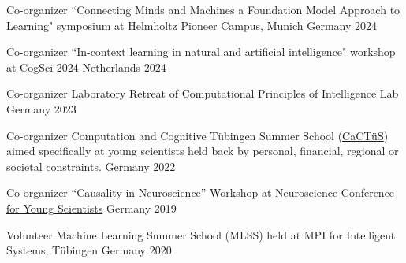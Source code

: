 
\begin{cvhonors}

  \cvhonor
    {Co-organizer} %
    {``Connecting Minds and Machines a Foundation Model Approach to Learning" symposium at Helmholtz Pioneer Campus, Munich} %
    {Germany} %
    {2024} %
    
  \cvhonor
    {Co-organizer} %
    {``In-context learning in natural and artificial intelligence" workshop at CogSci-2024} %
    {Netherlands} %
    {2024} %
    
  \cvhonor
    {Co-organizer} %
    {Laboratory Retreat of Computational Principles of Intelligence Lab} %
    {Germany} %
    {2023} %

    \cvhonor
    {Co-organizer} %
    {Computation and Cognitive Tübingen Summer School (\href{https://www.projects.tuebingen.mpg.de/}{CaCTüS}) aimed specifically at young scientists held back by personal, financial, regional or societal constraints.} %
    {Germany} %
    {2022} %


    \cvhonor
    {Co-organizer} %
    {``Causality in Neuroscience'' Workshop at \href{https://nenaconference.wordpress.com/wp-content/uploads/2019/10/schedule_nena2019.pdf}{Neuroscience Conference for Young Scientists}} %
    {Germany} %
    {2019} %

    \cvhonor
    {Volunteer} %
    {Machine Learning Summer School (MLSS) held at MPI for Intelligent Systems, Tübingen} %
    {Germany} %
    {2020} %

    \\
    
\end{cvhonors}
